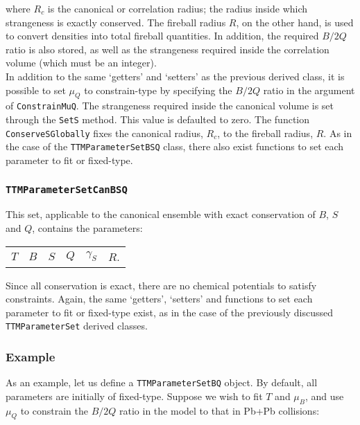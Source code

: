 \documentclass{elsarticle}
\begin{document}
\noindent
where $R_c$ is the canonical or correlation radius; the radius inside 
which strangeness is exactly conserved. The fireball radius $R$, on the other hand, is used to 
convert densities into total 
fireball quantities. In addition, the required $B/2Q$ 
ratio is also stored, as well as the strangeness required inside the
correlation volume (which must be an integer).\\ 

In addition to the same `getters' and `setters' as the previous derived class, it is possible to set 
$\mu_Q$ to constrain-type by specifying the $B/2Q$ ratio in the argument of 
\texttt{ConstrainMuQ}. The strangeness required inside the canonical
volume is set through the \texttt{SetS} method. This value is
defaulted to zero. The function \texttt{ConserveSGlobally} fixes the 
canonical radius, $R_c$, to the 
fireball radius, $R$. As in the case of the \texttt{TTMParameterSetBSQ} class, there also exist 
functions to set each parameter to fit or fixed-type.\\

\subsubsection{\texttt{TTMParameterSetCanBSQ}}
This set, applicable to the canonical ensemble with exact conservation of $B$, $S$ and $Q$, contains 
the parameters:\\
\begin{center}
\begin{tabular}{cccccc}
$T$ & $B$ & $S$ & $Q$ & $\gamma_S$ & $R$.\\
\end{tabular}
\end{center}

\noindent
Since all conservation is exact, there are no chemical potentials to satisfy constraints. Again, the same 
`getters', `setters' and functions to set each parameter to fit or fixed-type exist, as in the case 
of the previously discussed \texttt{TTMParameterSet} derived classes.\\

\subsubsection{Example}

As an example, let us define a \texttt{TTMParameterSetBQ} object. By default, all 
parameters are initially of fixed-type. Suppose we wish to fit $T$ and 
$\mu_B$, and use $\mu_Q$ to constrain the $B/2Q$ ratio in the model to that 
in Pb+Pb collisions:
\end{document}

